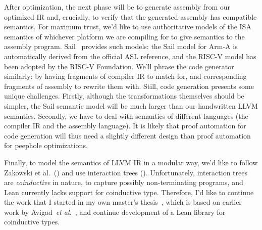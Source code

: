 \documentclass[a4paper]{scrartcl}
\newcommand*{\etal}{~\emph{et al.}}
\begin{document}

After optimization, the next phase will be to generate assembly from our
optimized IR and, crucially, to verify that the generated assembly has
compatible semantics. For maximum trust, we'd like to
use authoritative models of the ISA semantics of whichever platform we
are compiling for to give semantics to the assembly program. Sail~\cite{armstrongISASemanticsARMv8a2019} provides such models: the
Sail model for Arm-A is automatically derived from the official ASL
reference, and the RISC-V model has been adopted by the RISC-V
Foundation. We'll phrase the code generator similarly: by having
fragments of compiler IR to match for, and corresponding fragments of
assembly to rewrite them with. Still, code generation presents some
unique challenges. Firstly, although the transformations themselves
should be simpler, the Sail semantic model will be much larger than our
handwritten LLVM semantics. Secondly, we have to deal with semantics of
different languages (the compiler IR and the assembly language). It is
likely that proof automation for code generation will thus need a
slightly different design than proof automation for peephole
optimizations.

Finally, to model the semantics of LLVM IR in a modular way, we'd like
to follow Zakowski et
al.~(\cite{zakowskiModularCompositionalExecutable2021}) and use
interaction trees (\cite{xiaInteractionTreesRepresenting2020}).
Unfortunately, interaction trees are \emph{coinductive} in nature, to
capture possibly non-terminating programs, and Lean currently lacks
support for coinductive type. Therefore, I'd like to continue the work
that I started in my own master's thesis~\cite{keizerImplementingDefinitionalCodatatype}, which is based on earlier
work by Avigad\etal{}~\cite{avigadDataTypesQuotients2019}, and
continue development of a Lean library for coinductive types.
\end{document}
